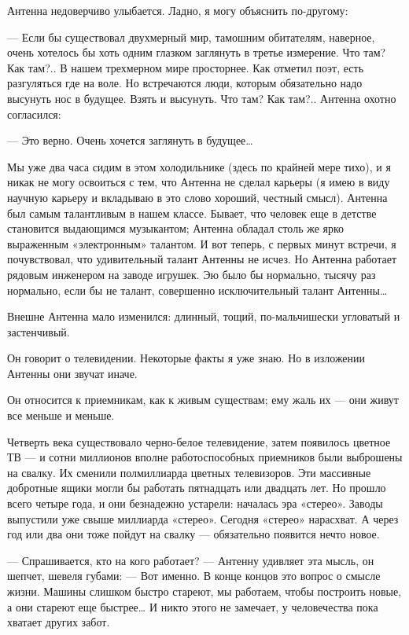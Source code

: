 Антенна недоверчиво улыбается. Ладно, я могу объяснить по-другому:

— Если бы существовал двухмерный мир, тамошним обитателям, наверное, очень
хотелось бы хоть одним глазком заглянуть в третье измерение. Что там?  Как
там?..  В  нашем  трехмерном  мире  просторнее.  Как  отметил  поэт,  есть
разгуляться где на  воле. Но  встречаются люди,  которым обязательно  надо
высунуть нос в  будущее. Взять  и высунуть.  Что там?  Как там?..  Антенна
охотно согласился:

— Это верно. Очень хочется заглянуть в будущее…

Мы уже два часа сидим в этом холодильнике (здесь по крайней мере тихо),  и
я никак не могу освоиться с тем,  что Антенна не сделал карьеры (я имею  в
виду научную  карьеру и  вкладываю в  это слово  хороший, честный  смысл).
Антенна был самым талантливым  в нашем классе. Бывает,  что человек еще  в
детстве становится выдающимся  музыкантом; Антенна обладал  столь же  ярко
выраженным «электронным» талантом. И вот теперь, с первых минут встречи, я
почувствовал,  что  удивительный  талант  Антенны  не  исчез.  Но  Антенна
работает рядовым инженером на заводе игрушек. Эю было бы нормально, тысячу
раз  нормально,  если  бы  не  талант,  совершенно  исключительный  талант
Антенны…

Внешне Антенна мало изменился: длинный, тощий, по-мальчишески угловатый  и
застенчивый.

Он говорит  о телевидении.  Некоторые факты  я уже  знаю. Но  в  изложении
Антенны они звучат иначе.

Он относится к приемникам, как к живым существам; ему жаль их — они  живут
все меньше и меньше.

Четверть  века  существовало  черно-белое  телевидение,  затем   появилось
цветное ТВ  — и  сотни миллионов  вполне работоспособных  приемников  были
выброшены на  свалку. Их  сменили  полмиллиарда цветных  телевизоров.  Эти
массивные добротные ящики могли бы  работать пятнадцать или двадцать  лет.
Но прошло  всего четыре  года,  и они  безнадежно устарели:  началась  эра
«стерео». Заводы выпустили уже свыше миллиарда «стерео». Сегодня  «стерео»
нарасхват. А через  год или два  они тоже пойдут  на свалку —  обязательно
появится нечто новое.

— Спрашивается, кто  на кого работает?  — Антенну удивляет  эта мысль,  он
шепчет, шевеля губами: —  Вот именно. В конце  концов это вопрос о  смысле
жизни. Машины слишком быстро стареют, мы работаем, чтобы построить  новые,
а они стареют еще быстрее… И никто этого не замечает, у человечества  пока
хватает других забот.

